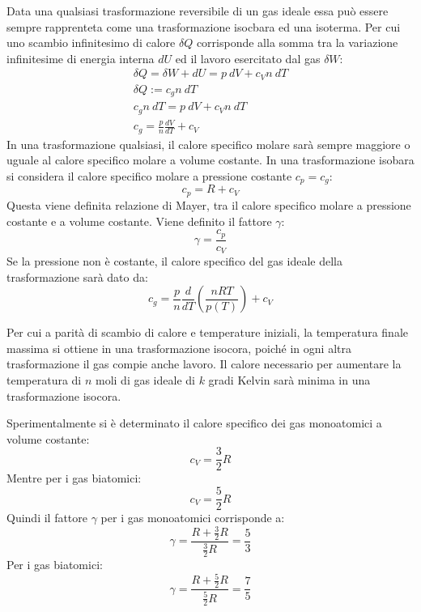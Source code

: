 \documentclass{article}
\numberwithin{equation}{subsection}
\begin{document}
Data una qualsiasi trasformazione reversibile di un gas ideale essa può essere sempre rapprenteta come una trasformazione isocbara ed una isoterma. Per cui uno scambio infinitesimo di calore $\delta Q$ 
corrisponde alla somma tra la variazione infinitesime di energia interna $dU$ ed il lavoro esercitato dal gas $\delta W$: 
\begin{gather*}
    \delta Q=\delta W+dU=p\:dV+c_Vn\:dT\\
    \delta Q :=c_gn\:dT\\
    c_gn\:dT=p\:dV+c_Vn\:dT\\
    c_g=\displaystyle\frac{p}{n}\frac{dV}{dT}+c_V
\end{gather*}
In una trasformazione qualsiasi, il calore specifico molare sarà sempre maggiore o uguale al calore specifico molare a volume costante. 
In una trasformazione isobara si considera il calore specifico molare a pressione costante $c_p=c_g$: 
\begin{equation}
    c_p=R+c_V
\end{equation}
Questa viene definita relazione di Mayer, tra il 
calore specifico molare a pressione costante e a volume costante. Viene definito il fattore $\gamma$:
\begin{equation}
    \gamma=\displaystyle\frac{c_p}{c_V}
\end{equation}
Se la pressione non è costante, il calore specifico del gas 
ideale della trasformazione sarà dato da:
\begin{equation*}
    c_g=\displaystyle\frac{p}{n}\frac{d}{dT}\left(\frac{nRT}{p(T)}\right)+c_V
\end{equation*}

Per cui a parità di scambio di calore e temperature iniziali, la temperatura finale massima si ottiene in una trasformazione isocora, poiché in ogni altra trasformazione 
il gas compie anche lavoro. Il calore necessario per aumentare la temperatura di $n$ moli di gas ideale di $k$ gradi Kelvin sarà minima in una trasformazione isocora. 


Sperimentalmente si è determinato il calore 
specifico dei gas monoatomici a volume costante: 
\begin{equation}
    c_V=\displaystyle\frac{3}{2}R
\end{equation}
Mentre per i gas biatomici:
\begin{equation}
    c_V=\displaystyle\frac{5}{2}R
\end{equation}
Quindi il fattore $\gamma$ per i gas monoatomici 
corrisponde a: 
\begin{equation}
    \gamma=\displaystyle\frac{R+\frac{3}{2}R}{\frac{3}{2}R}=\frac{5}{3}
\end{equation}
Per i gas biatomici: 
\begin{equation}
    \gamma=\displaystyle\frac{R+\frac{5}{2}R}{\frac{5}{2}R}=\frac{7}{5}
\end{equation}
\end{document}
